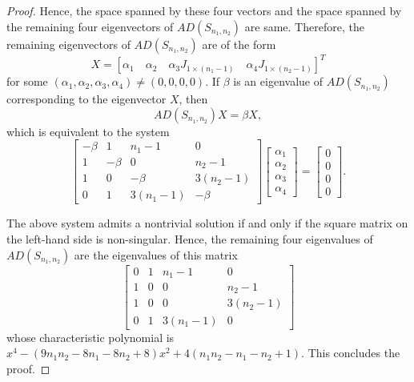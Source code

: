 \documentclass[10pt,a4paper]{amsart}
\begin{document}
\begin{proof}
	
	 
	 Hence, the space spanned by these four vectors and the space spanned by the remaining four eigenvectors of $AD(S_{n_1,n_2})$ are same. Therefore, the remaining eigenvectors of $AD(S_{n_1,n_2})$ are of the form 	  $$X=\left[
	 \alpha_1 \quad \alpha_2 \quad \alpha_3J_{1 \times (n_1-1)} \quad \alpha_4 J_{1 \times (n_2-1)}
	 \right]^T$$ for some $(\alpha_1, \alpha_2, \alpha_3, \alpha_4) \neq (0,0,0,0)$.  	 
	 If $\beta$ is an eigenvalue of $AD(S_{n_1,n_2})$ corresponding to the eigenvector $X$, then \[AD(S_{n_1,n_2})X = \beta X, \]	 
%	 
	 which is equivalent to the system 	 
	 \[\begin{bmatrix}
	 -\beta & 1  & n_1-1 & 0\\
	 1 &  -\beta & 0 & n_2-1\\
	 1 & 0 & -\beta & 3(n_2-1)\\
	 0 & 1 & 3(n_1-1) & -\beta
	 \end{bmatrix} 
	 \begin{bmatrix}
	 \alpha_1 \\ \alpha_2 \\ \alpha_3 \\ \alpha_4
	 \end{bmatrix} = 
	 \begin{bmatrix}
	  0 \\ 0 \\ 0 \\ 0
	 \end{bmatrix}.\] 
	 
	 The above system admits a nontrivial solution if and only if the square matrix on the left-hand side is non-singular. Hence, the remaining four eigenvalues of $AD(S_{n_1,n_2})$ are the eigenvalues of this matrix
	 \[\begin{bmatrix}
	 	0 & 1 & n_1-1 & 0\\
	 	1 & 0 & 0 & n_2-1\\
	 	1 & 0 & 0 & 3(n_2-1)\\
	 	0 & 1 & 3(n_1-1) & 0
	 \end{bmatrix}\]
	 whose characteristic polynomial is $x^4-\left(9n_1n_2-8n_1-8n_2+8\right)x^2+4\left(n_1n_2-n_1-n_2+1\right)$.
	 This concludes the proof.	 
	\end{proof}
\end{document}
